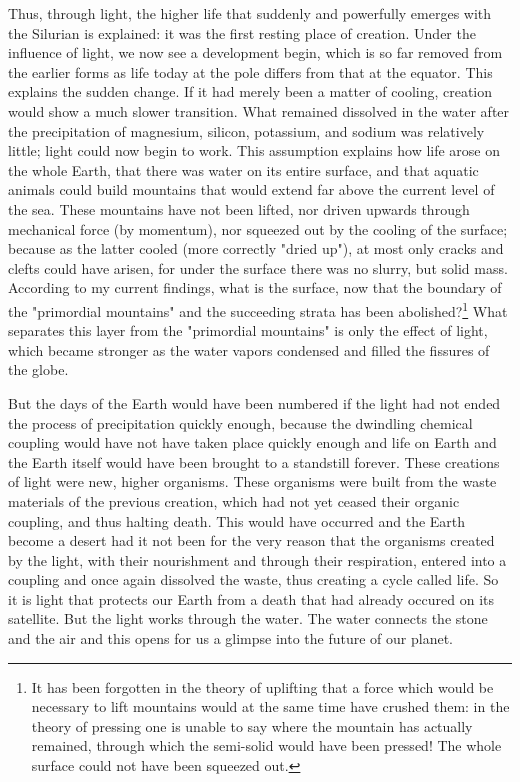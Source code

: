 \documentclass[a4paper, 11pt, oneside]{article}
\begin{document}
Thus, through light, the higher life that suddenly and powerfully emerges with the Silurian is explained: it was the first resting place of creation. Under the influence of light, we now see a development begin, which is so far removed from the earlier forms as life today at the pole differs from that at the equator. This explains the sudden change. If it had merely been a matter of cooling, creation would show a much slower transition. What remained dissolved in the water after the precipitation of magnesium, silicon, potassium, and sodium was relatively little; light could now begin to work. This assumption explains how life arose on the whole Earth, that there was water on its entire surface, and that aquatic animals could build mountains that would extend far above the current level of the sea. These mountains have not been lifted, nor driven upwards through mechanical force (by momentum), nor squeezed out by the cooling of the surface; because as the latter cooled (more correctly "dried up"), at most only cracks and clefts could have arisen, for under the surface there was no slurry, but solid mass. According to my current findings, what is the surface, now that the boundary of the "primordial mountains" and the succeeding strata has been abolished?\footnote{It has been forgotten in the theory of uplifting that a force which would be necessary to lift mountains would at the same time have crushed them: in the theory of pressing one is unable to say where the mountain has actually remained, through which the semi-solid would have been pressed! The whole surface could not have been squeezed out.} What separates this layer from the "primordial mountains" is only the effect of light, which became stronger as the water vapors condensed and filled the fissures of the globe.

But the days of the Earth would have been numbered if the light had not ended the process of precipitation quickly enough, because the dwindling chemical coupling would have not have taken place quickly enough and life on Earth and the Earth itself would have been brought to a standstill forever. These creations of light were new, higher organisms. These organisms were built from the waste materials of the previous creation, which had not yet ceased their organic coupling, and thus halting death. This would have occurred and the Earth become a desert had it not been for the very reason that the organisms created by the light, with their nourishment and through their respiration, entered into a coupling and once again dissolved the waste, thus creating a cycle called life. So it is light that protects our Earth from a death that had already occured on its satellite. But the light works through the water. The water connects the stone and the air and this opens for us a glimpse into the future of our planet.
\clearpage
\end{document}

